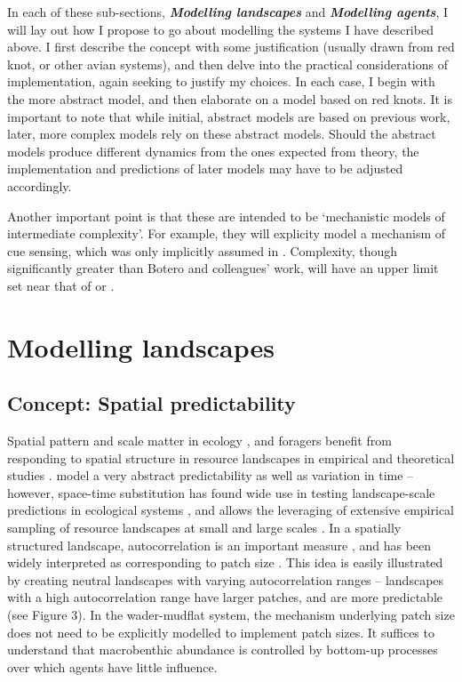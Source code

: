 In each of these sub-sections, \textbf{\emph{Modelling landscapes}} and \textbf{\emph{Modelling agents}}, I will lay out how I propose to go about modelling the systems I have described above. I first describe the concept with some justification (usually drawn from red knot, or other avian systems), and then delve into the practical considerations of implementation, again seeking to justify my choices. In each case, I begin with the more abstract model, and then elaborate on a model based on red knots. It is important to note that while initial, abstract models are based on previous work, later, more complex models rely on these abstract models. Should the abstract models produce different dynamics from the ones expected from theory, the implementation and predictions of later models may have to be adjusted accordingly.

Another important point is that these are intended to be `mechanistic models of intermediate complexity'. For example, they will explicity model a mechanism of cue sensing, which was only implicitly assumed in \citet{botero2015}. Complexity, though significantly greater than Botero and colleagues' work, will have an upper limit set near that of \citet{netz2017} or \citet{vandenberg2015a}.

\section{Modelling landscapes}

\subsection{Concept: Spatial predictability}

Spatial pattern and scale matter in ecology \citep{levin1992}, and foragers benefit from responding to spatial structure in resource landscapes in empirical and theoretical studies \citep{benhamou1992, walsh1996, klaassen2006, vangils2006, vangils2010, oudman2018, bijleveld2016}. \citet{botero2015} model a very abstract predictability as well as variation in time -- however, space-time substitution \citet{blois2013} has found wide use in testing landscape-scale predictions in ecological systems \citep[e.g.][]{hirota2011, staver2011}, and allows the leveraging of extensive empirical sampling of resource landscapes at small \citep[e.g.][]{bijleveld2012} and large scales \citep[e.g.][]{huete2002}.
In a spatially structured landscape, autocorrelation is an important measure \citep{legendre1993}, and has been widely interpreted as corresponding to patch size \citep{kraan2009, kraan2009a, vangils2010, bijleveld2016, oudman2018}. This idea is easily illustrated by creating neutral landscapes with varying autocorrelation ranges -- landscapes with a high autocorrelation range have larger patches, and are more predictable (see Figure 3). In the wader-mudflat system, the mechanism underlying patch size does not need to be explicitly modelled to implement patch sizes. It suffices to understand that macrobenthic abundance is controlled by bottom-up processes over which agents have little influence.

